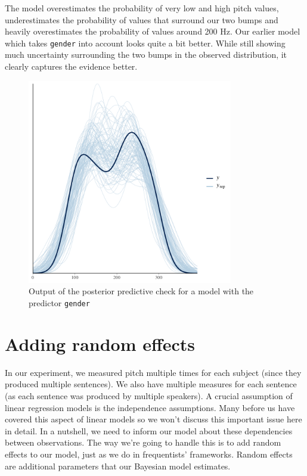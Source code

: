 \documentclass[nobib]{tufte-handout}
\begin{document}
The model overestimates the probability of very low and high pitch values, underestimates the probability of values that surround our two bumps and heavily overestimates the probability of values around 200 Hz.
Our earlier model which takes \texttt{gender} into account looks quite a bit better. While still showing much uncertainty surrounding the two bumps in the observed distribution, it clearly captures the evidence better. 

\begin{figure}[]
  \centering
    \includegraphics[width = 0.8\textwidth]{pics/pp_check_FE.pdf}
    \caption{Output of the posterior predictive check for a model with the predictor \texttt{gender}}
    \label{fig:coefficients_table}
\end{figure}


\section{Adding random effects}
In our experiment, we measured pitch multiple times for each subject (since they produced multiple sentences). We also have multiple measures for each sentence (as each sentence was produced by multiple speakers). A crucial assumption of linear regression models is the independence assumptions. Many before us have covered this aspect of linear models \citep[e.g.][]{Winter2013:Linear-models-a, clark1973language} so we won't discuss this important issue here in detail. In a nutshell, we need to inform our model about these dependencies between observations. The way we’re going to handle this is to add random effects to our model, just as we do in frequentists' frameworks. Random effects are additional parameters that our Bayesian model estimates.
\end{document}
